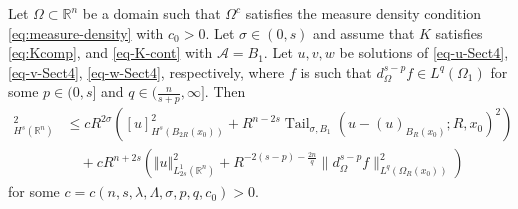 \documentclass[11pt,reqno]{amsart}
\theoremstyle{plain}
\theoremstyle{definition}
\numberwithin{equation}{section}
\newcommand{\R}{\mathbb{R}}
\newcommand{\1}{\mathbbm{1}}
\DeclareMathOperator{\tail}{Tail}
\begin{document}
\begin{lemma}
\label{lemma:freezing}
Let $\Omega \subset \R^n$ be a domain such that $\Omega^c$ satisfies the measure density condition \eqref{eq:measure-density} with $c_0>0$. Let $\sigma \in (0,s)$ and assume that $K$ satisfies \eqref{eq:Kcomp}, and \eqref{eq-K-cont} with $\mathcal{A} = B_1$.
Let $u, v, w$ be solutions of \eqref{eq-u-Sect4}, \eqref{eq-v-Sect4}, \eqref{eq-w-Sect4}, respectively, where $f$ is such that $d_{\Omega}^{s-p}f \in L^q(\Omega_1)$ for some $p \in (0,s]$ and $q\in(\frac{n}{s+p},\infty]$. Then
\begin{align*}
[w]_{H^s(\R^n)}^2
&\le c R^{2\sigma} \left( [u]_{H^s(B_{2R}(x_0))}^2 + R^{n-2s} \tail_{\sigma,B_1}(u - (u)_{B_R(x_0)};R, x_0)^2 \right) \\
&\quad + c R^{n + 2s} \left( \Vert u \Vert_{L^1_{2s}(\R^n)}^2 + R^{-2(s - p) - \frac{2n}{q}} \| d_{\Omega}^{s-p} f \|_{L^q(\Omega_R(x_0))}^2 \right)
\end{align*}
for some $c=c(n, s, \lambda, \Lambda, \sigma, p, q, c_0)>0$.
\end{lemma}
\end{document}
